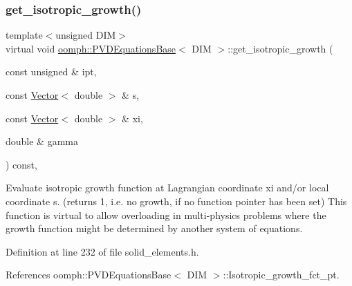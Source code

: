 \mbox{\label{classoomph_1_1PVDEquationsBase_a63cc799ade8521758da4ef1d16964137}} 
\subsubsection{\texorpdfstring{get\+\_\+isotropic\+\_\+growth()}{get\_isotropic\_growth()}}
{\footnotesize\ttfamily template$<$unsigned D\+IM$>$ \\
virtual void \hyperlink{classoomph_1_1PVDEquationsBase}{oomph\+::\+P\+V\+D\+Equations\+Base}$<$ D\+IM $>$\+::get\+\_\+isotropic\+\_\+growth (\begin{DoxyParamCaption}\item[{const unsigned \&}]{ipt,  }\item[{const \hyperlink{classoomph_1_1Vector}{Vector}$<$ double $>$ \&}]{s,  }\item[{const \hyperlink{classoomph_1_1Vector}{Vector}$<$ double $>$ \&}]{xi,  }\item[{double \&}]{gamma }\end{DoxyParamCaption}) const\hspace{0.3cm}{\ttfamily [inline]}, {\ttfamily [virtual]}}



Evaluate isotropic growth function at Lagrangian coordinate xi and/or local coordinate s. (returns 1, i.\+e. no growth, if no function pointer has been set) This function is virtual to allow overloading in multi-\/physics problems where the growth function might be determined by another system of equations. 



Definition at line 232 of file solid\+\_\+elements.\+h.



References oomph\+::\+P\+V\+D\+Equations\+Base$<$ D\+I\+M $>$\+::\+Isotropic\+\_\+growth\+\_\+fct\+\_\+pt.

\mbox{\label{classoomph_1_1PVDEquationsBase_a33ee6b6df8c9f3fbe9485d95db6c362d}} 
